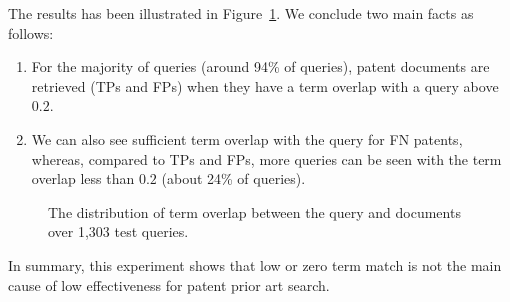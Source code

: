 The results has been illustrated in Figure~\ref{fig:overlap}. We conclude two main facts as follows:
\begin{enumerate}
\item For the majority of queries (around 94\% of queries), patent documents are retrieved (TPs and FPs) when they have a term overlap with a query above $ 0.2 $.
\item We can also see sufficient term overlap with the query for FN patents, whereas, compared to TPs and FPs, more queries can be seen with the term overlap less than $ 0.2 $ (about 24\% of queries). 
\end{enumerate}
 
\begin{figure}[t!]
\begin{centering}
\par\end{centering}

\protect\caption{The distribution of term overlap between the query and documents over 1,303 test queries.}
\label{fig:overlap}
\end{figure}
In summary, this experiment shows that low or zero term match is not the main cause of low effectiveness for patent prior art search.
